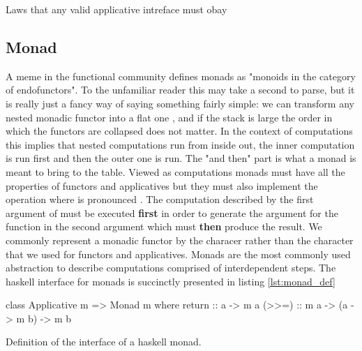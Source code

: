 \begin{code}
  \caption{\label{lst:applicative_laws}Laws that any valid applicative
    intreface must obay}
\end{code}

\subsection{Monad}

A meme in the functional community defines monads as "monoids in the
category of endofunctors". To the unfamiliar reader this may take a
second to parse, but it is really just a fancy way of saying something
fairly simple: we can transform any nested monadic functor  into a flat one , and if the stack is large  the order in which the functors are collapsed does
not matter. In the context of computations this implies that nested
computations run from inside out, the inner computation is run first
and then the outer one is run. The "and then" part is what a monad is
meant to bring to the table. Viewed as computations monads must have
all the properties of functors and applicatives but they must also
implement the operation  where
\hask{>>=} is pronounced . The computation described by the
first argument of \hask{>>=} must be executed \textbf{first} in order
to generate the argument for the function in the second argument which
must \textbf{then} produce the result. We commonly represent a monadic
functor by the characer  rather than the character 
that we used for functors and applicatives. Monads are the most
commonly used abstraction to describe computations comprised of
interdependent steps. The haskell interface for monads is succinctly
presented in listing \ref{lst:monad_def}

\begin{code}
\begin{haskellcode}
class Applicative m => Monad m where
  return :: a -> m a
  (>>=) :: m a -> (a -> m b) -> m b
\end{haskellcode}
  \caption{\label{lst:monad_def}Definition of the interface of a
    haskell monad.}
\end{code}

